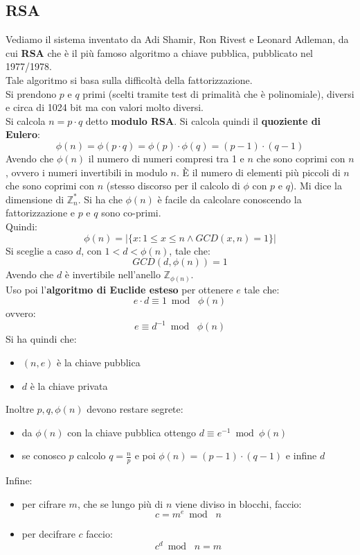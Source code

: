 \documentclass[a4paper,12pt, oneside]{book}
\begin{document}
\subsection{RSA}
Vediamo il sistema inventato da Adi Shamir, Ron Rivest e Leonard Adleman, da cui
\textbf{RSA} che è il più famoso algoritmo a chiave pubblica, pubblicato nel
1977/1978.\\
Tale algoritmo si basa sulla difficoltà della fattorizzazione.\\
Si prendono $p$ e $q$ primi (scelti tramite test di primalità che è
polinomiale), diversi e circa di 1024 bit ma con valori molto 
diversi.\\
Si calcola $n=p\cdot q$ detto \textbf{modulo RSA}. Si calcola quindi il
\textbf{quoziente di Eulero}:
\[\phi(n)=\phi(p\cdot q)=\phi(p)\cdot \phi(q)=(p-1)\cdot (q-1)\]
Avendo che $\phi(n)$ il numero di numeri compresi tra 1 e $n$ che sono coprimi
con $n$, ovvero i numeri invertibili in modulo $n$. È il numero di elementi più
piccoli di $n$ che sono coprimi con $n$ (stesso discorso per il calcolo di
$\phi$ con $p$ e $q$). Mi dice la dimensione di
$\mathbb{Z}_{n}^*$.
Si ha che $\phi(n)$ è facile da calcolare conoscendo la fattorizzazione e $p$ e
$q$ sono co-primi.\\
Quindi:
\[\phi(n)=|\{x:1\leq x\leq n\land GCD(x,n)=1\}|\]
Si sceglie a caso $d$, con $1<d<\phi(n)$, tale che:
\[GCD(d,\phi(n))=1\]
Avendo che $d$ è invertibile nell'anello $\mathbb{Z}_{\phi(n)}$.\\
Uso poi l'\textbf{algoritmo di Euclide esteso} per ottenere $e$ tale che:
\[e\cdot d\equiv 1\bmod \,\,\phi(n)\]
ovvero:
\[e\equiv d^{-1}\bmod\,\,\phi(n)\]
Si ha quindi che:
\begin{itemize}
  \item $(n,e)$ è la chiave pubblica
  \item $d$ è la chiave privata
\end{itemize}
Inoltre $p,q,\phi(n)$ devono restare segrete:
\begin{itemize}
  \item da $\phi(n)$ con la chiave pubblica ottengo $d\equiv e^{-1}\bmod\phi(n)$
  \item se conosco $p$ calcolo $q=\frac{n}{p}$ e poi $\phi(n)=(p-1)\cdot (q-1)$
  e infine $d$
\end{itemize}
Infine:
\begin{itemize}
  \item per cifrare $m$, che se lungo più di $n$ viene diviso in blocchi, faccio:
  \[c=m^e\bmod\,\,n\]
  \item per decifrare $c$ faccio:
  \[c^d\bmod\,\,n=m\]
\end{itemize}
\end{document}

